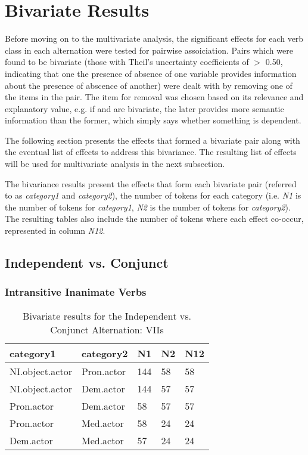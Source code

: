 \FloatBarrier

\section{Bivariate Results}
Before moving on to the multivariate analysis, the significant effects for each verb class in each alternation were tested for pairwise assoiciation. Pairs which were found to be bivariate (those with Theil’s uncertainty coefficients \citep{theil1970estimation} of $>$ 0.50, indicating that one the presence of absence of one variable provides information about the presence of abscence of another) were dealt with by removing one of the items in the pair. The item for removal was chosen based on its relevance and explanatory value, e.g. if  and  are bivariate, the later provides more semantic information than the former, which simply says whether something is dependent. 

The following section presents the effects that formed a bivariate pair along with the eventual list of effects to address this bivariance. The resulting list of effects will be used for multivariate analysis in the next subsection.

The bivariance results present the effects that form each bivariate pair (referred to as \textit{category1} and \textit{category2}), the number of tokens for each category (i.e. \textit{N1} is the number of tokens for \textit{category1},  \textit{N2} is the number of tokens for \textit{category2}). The resulting tables also include the number of tokens where each effect co-occur, represented in column \textit{N12}.

\subsection{Independent vs. Conjunct}
\subsubsection{Intransitive Inanimate Verbs}
\FloatBarrier

\begin{table}[H]
\centering
\begin{tabular}{lllll}
\toprule
category1        & category2  & N1   & N2   & N12 \\
\midrule
NI.object.actor & Pron.actor & 144 & 58 & 58 \\
NI.object.actor & Dem.actor & 144 & 57 & 57 \\
Pron.actor & Dem.actor & 58 & 57 & 57 \\
Pron.actor & Med.actor & 58 & 24 & 24 \\
Dem.actor & Med.actor & 57 & 24 & 24 \\
\bottomrule
\end{tabular}
\caption{
   Bivariate results for the Independent vs. Conjunct Alternation: VIIs \\ \label{tab:iiindcuni}
  }
\end{table}

